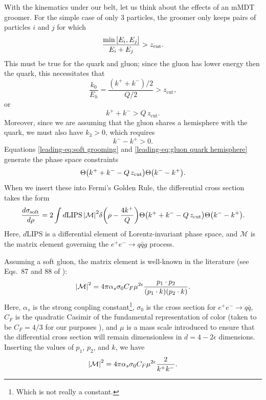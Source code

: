\documentclass[../thesis.tex]{subfiles}
\providecommand{\zcut}{z_\mathrm{{cut}}}
\providecommand{\LIPS}{\mathrm{LIPS}}
\providecommand{\cM}{\mathcal{M}}
\begin{document}
	With the kinematics under our belt, let us think about the effects of an mMDT groomer. For the simple case of only 3 particles, the groomer only keeps pairs of particles $i$ and $j$ for which \cite{dasgupta_towards_2013,kardos_two-_2020}
	\begin{equation}
		\frac{\min\qty[E_i, E_j]}{E_i + E_j} > \zcut.
	\end{equation}
	This must be true for the quark and gluon; since the gluon has lower energy then the quark, this necessitates that
	\begin{equation}
		\frac{k_0}{E_h} = \frac{(k^+ + k^-)/2}{Q/2} > \zcut,
	\end{equation}
	or
	\begin{equation}\label{leading-eq:soft grooming}
		k^+ + k^- > Q\,\zcut.
	\end{equation}
	Moreover, since we are assuming that the gluon shares a hemisphere with the quark, we must also have $k_3 > 0$, which requires
	\begin{equation}\label{leading-eq:gluon quark hemisphere}
		k^- - k^+ > 0.
	\end{equation}
	Equations \ref{leading-eq:soft grooming} and \ref{leading-eq:gluon quark hemisphere} generate the phase space constraints
	\begin{equation}
		\Theta\qty(k^+ + k^- - Q\,\zcut)\Theta\qty(k^- - k^+).
	\end{equation}
	When we insert these into Fermi's Golden Rule, the differential cross section takes the form
	\begin{equation}\label{leading-eq:soft cross section preliminary}
		\frac{d\sigma_{\text{soft}}}{d\rho} = 2\int d\LIPS\,\abs{\cM}^2 \delta\qty(\rho - \frac{4k^+}{Q}) \Theta\qty(k^+ + k^- - Q\,\zcut)\Theta\qty(k^- - k^+).
	\end{equation}
	Here, $d\LIPS$ is a differential element of Lorentz-invariant phase space, and $\cM$ is the matrix element governing the $e^+ e^- \to q\bar q g$ process.

	Assuming a soft gluon, the matrix element is well-known in the literature (see Eqs.\ 87 and 88 of \cite{catani_infrared_2000}):
	\begin{equation}
		\abs{\cM}^2 = 4\pi \alpha_s \sigma_0 C_F \mu^{2\epsilon} \frac{p_1 \cdot p_2}{(p_1 \cdot k)(p_2 \cdot k)}.
	\end{equation}
	Here, $\alpha_s$ is the strong coupling constant\footnote{Which is not really a constant.}, $\sigma_0$ is the cross section for $e^+ e^- \to q\bar q$, $C_F$ is the quadratic Casimir of the fundamental representation of color (taken to be $C_F = 4/3$ for our purposes \cite{particle_data_group_review_2020}), and $\mu$ is a mass scale introduced to ensure that the differential cross section will remain dimensionless in $d = 4 - 2\epsilon$ dimensions. Inserting the values of $p_1$, $p_2$, and $k$, we have
	\begin{equation}\label{leading-eq:soft matrix element}
		\abs{\cM}^2 = 4\pi \alpha_s \sigma_0 C_F \mu^{2\epsilon} \frac{2}{k^+ k^-}.
	\end{equation}
\end{document}
